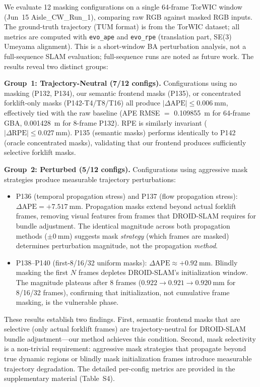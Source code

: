 \documentclass[journal]{IEEEtran}
\begin{document}
We evaluate 12 masking configurations on a single 64-frame TorWIC window (Jun~15 Aisle\_CW\_Run\_1), comparing raw RGB against masked RGB inputs. The ground-truth trajectory (TUM format) is from the TorWIC dataset; all metrics are computed with \texttt{evo\_ape} and \texttt{evo\_rpe} (translation part, SE(3) Umeyama alignment). This is a short-window BA perturbation analysis, not a full-sequence SLAM evaluation; full-sequence runs are noted as future work. The results reveal two distinct groups:

\textbf{Group~1: Trajectory-Neutral (7/12 configs).} Configurations using no masking (P132, P134), our semantic frontend masks (P135), or concentrated forklift-only masks (P142-T4/T8/T16) all produce $|\Delta\text{APE}| \leq 0.006~\text{mm}$, effectively tied with the raw baseline (APE RMSE $=$ 0.109855~m for 64-frame GBA, 0.001428~m for 8-frame P132). RPE is similarly invariant ($|\Delta\text{RPE}| \leq 0.027~\text{mm}$). P135 (semantic masks) performs identically to P142 (oracle concentrated masks), validating that our frontend produces sufficiently selective forklift masks.

\textbf{Group~2: Perturbed (5/12 configs).} Configurations using aggressive mask strategies produce measurable trajectory perturbations:
\begin{itemize}
  \item P136 (temporal propagation stress) and P137 (flow propagation stress): $\Delta\text{APE} = +7.517~\text{mm}$. Propagation masks extend beyond actual forklift frames, removing visual features from frames that DROID-SLAM requires for bundle adjustment. The identical magnitude across both propagation methods ($\pm 0~\text{mm}$) suggests mask \textit{strategy} (which frames are masked) determines perturbation magnitude, not the propagation \textit{method}.
  \item P138--P140 (first-8/16/32 uniform masks): $\Delta\text{APE} \approx +0.92~\text{mm}$. Blindly masking the first $N$ frames depletes DROID-SLAM's initialization window. The magnitude plateaus after 8 frames ($0.922 \rightarrow 0.921 \rightarrow 0.920~\text{mm}$ for 8/16/32 frames), confirming that initialization, not cumulative frame masking, is the vulnerable phase.
\end{itemize}

These results establish two findings. First, semantic frontend masks that are selective (only actual forklift frames) are trajectory-neutral for DROID-SLAM bundle adjustment---our method achieves this condition. Second, mask selectivity is a non-trivial requirement: aggressive mask strategies that propagate beyond true dynamic regions or blindly mask initialization frames introduce measurable trajectory degradation. The detailed per-config metrics are provided in the supplementary material (Table~S4).
\end{document}
